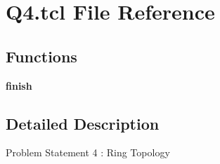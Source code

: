 \hypertarget{Q4_8tcl}{}\section{Q4.\+tcl File Reference}
\label{Q4_8tcl}
\subsection*{Functions}
\begin{DoxyCompactItemize}
\item 
\mbox{\label{Q4_8tcl_a30728837c246b65ef76298af0101d99c}} 
{\bfseries finish}
\end{DoxyCompactItemize}


\subsection{Detailed Description}
Problem Statement 4 \+: Ring Topology

\begin{DoxyVerb}
\end{DoxyVerb}
